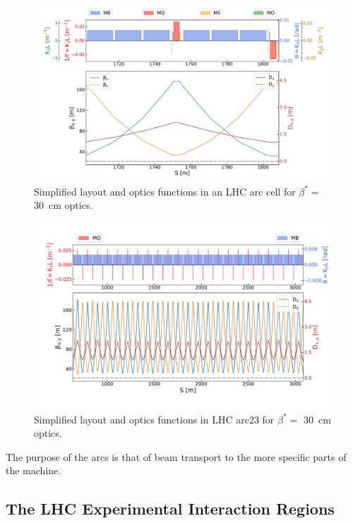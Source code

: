 \begin{figure}[!hbt]
  \centering
  \includegraphics*[width=0.99\linewidth]{Figures/Optics_Measurements_Corrections_at_LHC/lhc_arc_cell.pdf}
  \caption{Simplified layout and optics functions in an LHC arc cell for \(\beta^{\ast} =\) \qty{30}{\centi\meter} optics.}
  \label{figure:lhc_arc_cell_latwiss}
\end{figure}

\begin{figure}[!hbt]
  \centering
  \includegraphics*[width=0.99\linewidth]{Figures/Optics_Measurements_Corrections_at_LHC/lhc_arc23.pdf}
  \caption{Simplified layout and optics functions in LHC arc\num{23} for \(\beta^{\ast} =\) \qty{30}{\centi\meter} optics.}
  \label{figure:lhc_arc23_latwiss}
\end{figure}

The purpose of the arcs is that of beam transport to the more specific parts of the machine.

\subsection{The LHC Experimental Interaction Regions}
\label{subsection:lhc_eirs}

